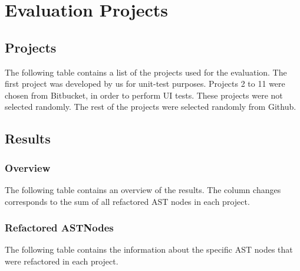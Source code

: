 \documentclass[type=bsc,accentcolor=tud9c]{tudthesis}
\begin{document}
\section{Evaluation Projects}
\subsection{Projects}
The following table contains a list of the projects used for the evaluation. The first project was developed by us for unit-test purposes. Projects 2 to 11 were chosen from Bitbucket, in order to perform UI tests. These projects were not selected randomly. The rest of the projects were selected randomly from Github.
\label{appendix:eval-projects}


\newpage
\subsection{Results}
\subsubsection{Overview}
The following table contains an overview of the results. The column changes corresponds to the sum of all refactored AST nodes in each project.
\label{appendix:eval-results-overview}


\newpage
\subsubsection{Refactored ASTNodes}
The following table contains the information about the specific AST nodes that were refactored in each project.
\label{appendix:eval-details}

\end{document}
